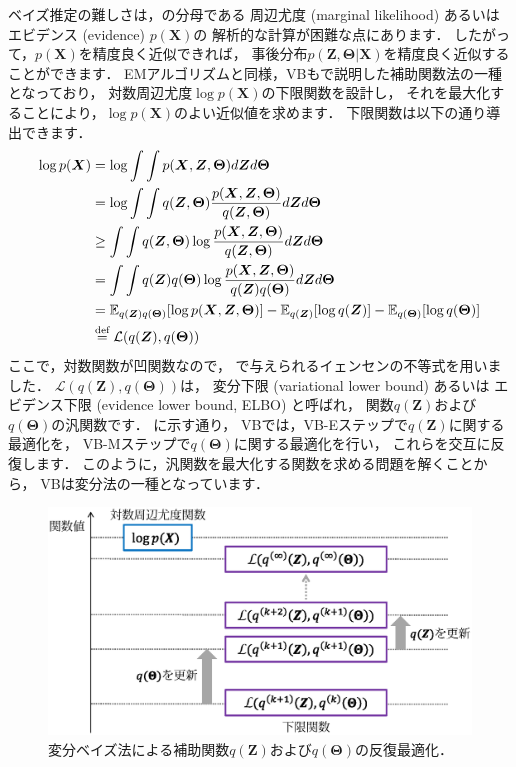 ベイズ推定の難しさは，の分母である
周辺尤度 (marginal likelihood) あるいはエビデンス (evidence) $p(\bm{X})$の
解析的な計算が困難な点にあります．
したがって，$p(\bm{X})$を精度良く近似できれば，
事後分布$p(\bm{Z},\bm\Theta|\bm{X})$を精度良く近似することができます．
EMアルゴリズムと同様，VBもで説明した補助関数法の一種となっており，
対数周辺尤度$\log p(\bm{X})$の下限関数を設計し，
それを最大化することにより，$\log p(\bm{X})$のよい近似値を求めます．
下限関数は以下の通り導出できます．
\begin{align}
 \log p(\bm{X})
&= \log \int\int p(\bm{X},\bm{Z},\bm\Theta) d\bm{Z}d\bm\Theta
 \nonumber\\
&= \log \int\int q(\bm{Z},\bm\Theta)
 \frac{p(\bm{X},\bm{Z},\bm\Theta)}{q(\bm{Z},\bm\Theta)} d\bm{Z}d\bm\Theta
 \nonumber\\
&
 \ge \int\int q(\bm{Z},\bm\Theta)
 \log \frac{p(\bm{X},\bm{Z},\bm\Theta)}{q(\bm{Z},\bm\Theta)} d\bm{Z}d\bm\Theta
 \nonumber\\
&
 = \int\int q(\bm{Z})q(\bm\Theta)
 \log \frac{p(\bm{X},\bm{Z},\bm\Theta)}{q(\bm{Z})q(\bm\Theta)} d\bm{Z}d\bm\Theta
 \nonumber\\
&
 = \mathbb{E}_{q(\bm{Z})q(\bm\Theta)}[\log p(\bm{X},\bm{Z},\bm\Theta)]
 - \mathbb{E}_{q(\bm{Z})}[\log q(\bm{Z})]
 - \mathbb{E}_{q(\bm\Theta)}[\log q(\bm\Theta)]
 \nonumber\\
&
 \overset{\mbox{\scriptsize def}}{=} \mathcal{L}(q(\bm{Z}),q(\bm\Theta))
\label{eq:vb_lower_bound}
\end{align}
ここで，対数関数が凹関数なので，
で与えられるイェンセンの不等式を用いました．
$\mathcal{L}(q(\bm{Z}),q(\bm\Theta))$は，
変分下限 (variational lower bound) あるいは
エビデンス下限 (evidence lower bound, ELBO) と呼ばれ，
関数$q(\bm{Z})$および$q(\bm\Theta)$の汎関数です．
に示す通り，
VBでは，VB-Eステップで$q(\bm{Z})$に関する最適化を，
VB-Mステップで$q(\bm\Theta)$に関する最適化を行い，
これらを交互に反復します．
このように，汎関数を最大化する関数を求める問題を解くことから，
VBは変分法の一種となっています．

\begin{figure}[t]
\centering
\includegraphics[width=.94\linewidth]{sections/optimization/vb_update}
\vspace{-2mm}
\caption{変分ベイズ法による補助関数$q(\bm{Z})$および$q(\bm\Theta)$の反復最適化．}
\label{fig:vb_update}
\end{figure}

